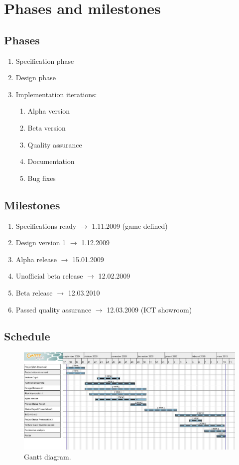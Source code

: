 \documentclass[12pt,a4paper]{article}
\begin{document}
\section{Phases and milestones}

\subsection{Phases}
\begin{enumerate}
\item Specification phase
\item Design phase	
\item Implementation iterations:
\begin{enumerate}
\item Alpha version
\item Beta version
\item Quality assurance
\item Documentation
\item Bug fixes
\end{enumerate}
\end{enumerate}

\subsection{Milestones}

\begin{enumerate}
\item Specifications ready
	$\rightarrow$ 1.11.2009 (game defined)
\item Design version 1
	$\rightarrow$ 1.12.2009
\item Alpha release
	$\rightarrow$ 15.01.2009
\item Unofficial beta release
	$\rightarrow$ 12.02.2009 
\item Beta release
	$\rightarrow$ 12.03.2010
\item Passed quality assurance
	$\rightarrow$ 12.03.2009 (ICT  showroom)
\end{enumerate}

\subsection{Schedule}

\begin{figure}[h!]
\centering
\includegraphics[width=13cm]{pic/gantt.jpg}
\caption{Gantt diagram.}
\label{fig:ganttdia}
\end{figure}
\end{document}
